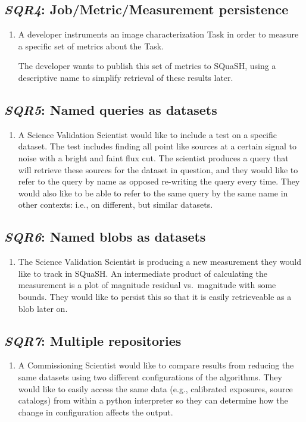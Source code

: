\documentclass[DM,toc,lsstdraft]{lsstdoc}
\newcommand{\usecase}[3]{%
\subsection{\emph{#1}: #2}
\label{use:#1}
\begin{enumerate}[label=\alph*.]
#3
\end{enumerate}
}
\begin{document}
\usecase{SQR4}{Job/Metric/Measurement persistence}{%

\item
A developer instruments an image characterization Task in order to measure a specific set of metrics about the Task.

The developer wants to publish this set of metrics to SQuaSH, using a descriptive name to simplify retrieval of these results later.

}

\usecase{SQR5}{Named queries as datasets}{%

\item
A Science Validation Scientist would like to include a test on a specific dataset.
The test includes finding all point like sources at a certain signal to noise with a bright and faint flux cut.
The scientist produces a query that will retrieve these sources for the dataset in question, and they would like to refer to the query by name as opposed re-writing the query every time.
They would also like to be able to refer to the same query by the same name in other contexts: i.e., on different, but similar datasets.

}

\usecase{SQR6}{Named blobs as datasets}{%

\item
The Science Validation Scientist is producing a new measurement they would like to track in SQuaSH.
An intermediate product of calculating the measurement is a plot of magnitude residual vs.\ magnitude with some bounds.
They would like to persist this so that it is easily retrieveable as a blob later on.

}

\usecase{SQR7}{Multiple repositories}{%

\item
A Commissioning Scientist would like to compare results from reducing the same datasets using two different configurations of the algorithms.
They would like to easily access the same data (e.g., calibrated exposures, source catalogs) from within a python interpreter so they can determine how the change in configuration affects the output.

}
\end{document}
